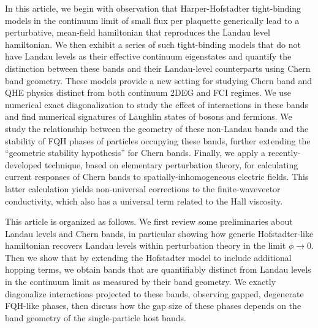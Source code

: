 \documentclass[aps,prb,twocolumn,letterpaper,twoside,nobalancelastpage,groupedaddress,amsmath,amssymb,floatfix,citeautoscript]{revtex4-1}
\begin{document}
In this article, we begin with observation that Harper-Hofstadter tight-binding models in the continuum limit of small flux per plaquette generically lead to a perturbative, mean-field hamiltonian that reproduces the Landau level hamiltonian. We then exhibit a series of such tight-binding models that do not have Landau levels as their effective continuum eigenstates and quantify the distinction between these bands and their Landau-level counterparts using Chern band geometry. These models provide a new setting for studying Chern band and QHE physics distinct from both continuum 2DEG and FCI regimes. We use numerical exact diagonalization to study the effect of interactions in these bands and find numerical signatures of Laughlin states of bosons and fermions. We study the relationship between the geometry of these non-Landau bands and the stability of FQH phases of particles occupying these bands, further extending the ``geometric stability hypothesis'' for Chern bands\cite{jackson_geometric_2015}. Finally, we apply a recently-developed technique, based on elementary perturbation theory\cite{harper_finite-wavevector_2018}, for calculating current responses of Chern bands to spatially-inhomogeneous electric fields. This latter calculation yields non-universal corrections to the finite-wavevector conductivity, which also has a universal term related to the Hall viscosity.

This article is organized as follows. We first review some preliminaries about Landau levels and Chern bands, in particular showing how generic Hofstadter-like hamiltonian recovers Landau levels within perturbation theory in the limit $\phi\rightarrow 0$. Then we show that by extending the Hofstadter model to include additional hopping terms, we obtain bands that are quantifiably distinct from Landau levels in the continuum limit as measured by their band geometry. We exactly diagonalize interactions projected to these bands, observing gapped, degenerate FQH-like phases, then discuss how the gap size of these phases depends on the band geometry of the single-particle host bands. 
\end{document}
